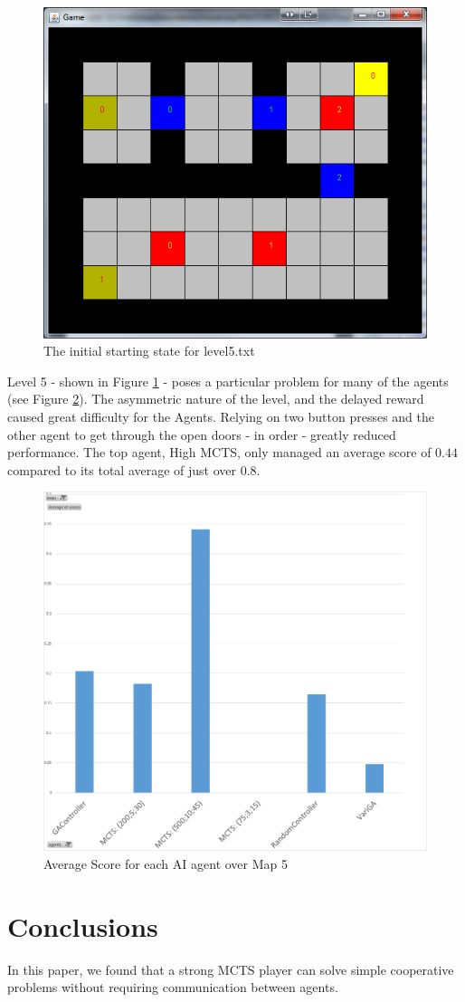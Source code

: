 \documentclass{IEEEtran}
\begin{document}
\pagebreak
\begin{figure}[ht]
\centering
\includegraphics[scale=0.5]{level5}
\caption{The initial starting state for level5.txt}
\label{Level5State}
\end{figure}
Level 5 - shown in Figure \ref{Level5State} - poses a particular problem for many of the agents (see Figure \ref{avgScoreMap5}). The asymmetric nature of the level, and the delayed reward caused great difficulty for the Agents. Relying on two button presses and the other agent to get through the open doors - in order - greatly reduced performance. The top agent, High MCTS, only managed an average score of $0.44$ compared to its total average of just over 0.8.


\begin{figure}[ht]
\centering
\includegraphics[trim=0cm 0cm 5cm 3cm, clip=true, width = \linewidth]{avgScoreOverMap5}
\caption{Average Score for each AI agent over Map 5}
\label{avgScoreMap5}
\end{figure}

\section{Conclusions}
In this paper, we found that a strong MCTS player can solve simple cooperative problems without requiring communication between agents.


\end{document}
